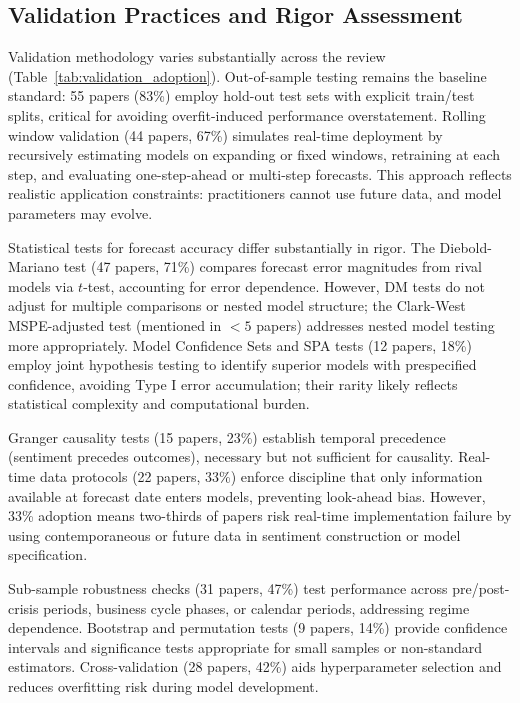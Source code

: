 \subsection{Validation Practices and Rigor Assessment}

Validation methodology varies substantially across the review (Table~\ref{tab:validation_adoption}). Out-of-sample testing remains the baseline standard: 55 papers (83\%) employ hold-out test sets with explicit train/test splits, critical for avoiding overfit-induced performance overstatement. Rolling window validation (44 papers, 67\%) simulates real-time deployment by recursively estimating models on expanding or fixed windows, retraining at each step, and evaluating one-step-ahead or multi-step forecasts. This approach reflects realistic application constraints: practitioners cannot use future data, and model parameters may evolve.

Statistical tests for forecast accuracy differ substantially in rigor. The Diebold-Mariano test (47 papers, 71\%) compares forecast error magnitudes from rival models via $t$-test, accounting for error dependence. However, DM tests do not adjust for multiple comparisons or nested model structure; the Clark-West MSPE-adjusted test (mentioned in $<5$ papers) addresses nested model testing more appropriately. Model Confidence Sets and SPA tests (12 papers, 18\%) employ joint hypothesis testing to identify superior models with prespecified confidence, avoiding Type I error accumulation; their rarity likely reflects statistical complexity and computational burden.

Granger causality tests (15 papers, 23\%) establish temporal precedence (sentiment precedes outcomes), necessary but not sufficient for causality. Real-time data protocols (22 papers, 33\%) enforce discipline that only information available at forecast date enters models, preventing look-ahead bias. However, 33\% adoption means two-thirds of papers risk real-time implementation failure by using contemporaneous or future data in sentiment construction or model specification.

Sub-sample robustness checks (31 papers, 47\%) test performance across pre/post-crisis periods, business cycle phases, or calendar periods, addressing regime dependence. Bootstrap and permutation tests (9 papers, 14\%) provide confidence intervals and significance tests appropriate for small samples or non-standard estimators. Cross-validation (28 papers, 42\%) aids hyperparameter selection and reduces overfitting risk during model development.


